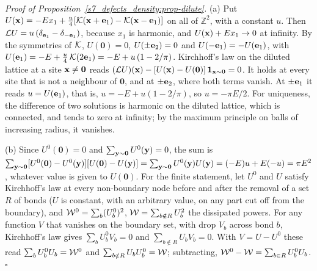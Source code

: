 \emph{Proof of Proposition~\ref{s7_defects_density:prop-dilute}.}
(a) Put $U(\mathbf{x})=-Ex_1+\frac u4[\mathcal{K}(\mathbf{x}+\mathbf{e}_1)-\mathcal{K}(\mathbf{x}-\mathbf{e}_1)]$ on all of $\mathbb Z^{2}$, with a constant $u$. Then
$\mathcal{L} U=u\,(\delta_{\mathbf{e}_1}-\delta_{-\mathbf{e}_1})$, because $x_1$ is harmonic, and $U(\mathbf{x})+Ex_1\to0$ at infinity. By the
symmetries of $\mathcal{K}$, $U(\mathbf 0)=0$, $U(\pm\mathbf{e}_2)=0$ and $U(-\mathbf{e}_1)=-U(\mathbf{e}_1)$, with
$U(\mathbf{e}_1)=-E+\frac u4\,\mathcal{K}(2\mathbf{e}_1)=-E+u\,(1-2/\pi)$. Kirchhoff's law on the diluted lattice at a site $\mathbf{x}\neq\mathbf 0$
reads $(\mathcal{L} U)(\mathbf{x})-[U(\mathbf{x})-U(\mathbf 0)]\,\mathbf 1_{\mathbf{x}\sim\mathbf 0}=0$. It holds at every site that is not a
neighbour of $\mathbf 0$, and at $\pm\mathbf{e}_2$, where both terms vanish. At $\pm\mathbf{e}_1$ it reads $u=U(\mathbf{e}_1)$, that is,
$u=-E+u(1-2/\pi)$, so $u=-\pi E/2$. For uniqueness, the difference of two solutions is harmonic on the diluted
lattice, which is connected, and tends to zero at infinity; by the maximum principle on balls of
increasing radius, it vanishes.

(b) Since $U^{0}(\mathbf 0)=0$ and $\sum_{\mathbf{y}\sim\mathbf 0}U^{0}(\mathbf{y})=0$, the sum is
$\sum_{\mathbf{y}\sim\mathbf 0}[U^{0}(\mathbf 0)-U^{0}(\mathbf{y})][U(\mathbf 0)-U(\mathbf{y})]=\sum_{\mathbf{y}\sim\mathbf 0}U^{0}(\mathbf{y})U(\mathbf{y})
=(-E)u+E(-u)=\pi E^{2}$, whatever value is given to $U(\mathbf 0)$. For the finite statement, let $U^{0}$ and $U$ satisfy
Kirchhoff's law at every non-boundary node before and after the removal of a set $R$ of bonds ($U$ is constant, with
an arbitrary value, on any part cut off from the boundary), and $\mathcal{W}^{0}=\sum_b(U^{0}_b)^{2}$,
$\mathcal{W}=\sum_{b\notin R}U_b^{2}$ the dissipated powers. For any function $V$ that vanishes on the boundary set, with drop $V_b$ across bond $b$,
Kirchhoff's law gives $\sum_bU^{0}_bV_b=0$ and $\sum_{b\notin R}U_bV_b=0$. With $V=U-U^{0}$ these read
$\sum_bU^{0}_bU_b=\mathcal{W}^{0}$ and $\sum_{b\notin R}U_bU^{0}_b=\mathcal{W}$; subtracting, $\mathcal{W}^{0}-\mathcal{W}=\sum_{b\in R}U^{0}_bU_b$.
\hfill$\square$

